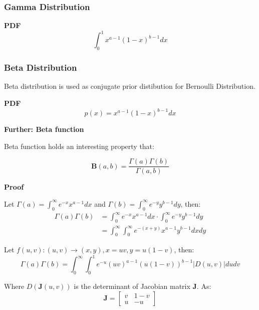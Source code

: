 \documentclass{article}
\begin{document}
\subsubsection{Gamma Distribution}
\vspace{2mm}
\textbf{PDF}
\begin{equation}
\int_0^1x^{a-1}(1-x)^{b-1}dx
\end{equation}

\subsubsection{Beta Distribution}
Beta distribution is used as conjugate prior distibution for Bernoulli Distribution.

\vspace{2mm}
\textbf{PDF}
\begin{equation}
p(x)=x^{a-1}(1-x)^{b-1}dx
\end{equation}

\vspace{2mm}
\textbf{Further: Beta function}

Beta function holds an interesting property that:

\begin{equation}
\mathbf{B}(a, b) = \frac{\Gamma{(a)}\Gamma{(b)}}{\Gamma{(a, b)}}
\end{equation}

\vspace{2mm}
\textbf{Proof}

Let \(\Gamma(a)=\int_0^{\infty}e^{-x}x^{a-1}dx\) and \(\Gamma(b)=\int_0^{\infty}e^{-y}y^{b-1}dy\), then:
\begin{equation}
\begin{split}
\Gamma(a)\Gamma(b)&=\int_0^{\infty}e^{-x}x^{a-1}dx \cdot \int_0^{\infty}e^{-y}y^{b-1}dy\\
&=\int_0^{\infty}\int_0^{\infty}e^{-(x+y)}x^{a-1}y^{b-1}dxdy
\end{split}
\end{equation}

Let \(f(u, v): (u, v) \rightarrow (x, y), x=uv, y=u(1-v)\), then:
\begin{equation}
\Gamma{(a)}\Gamma{(b)}=\int_0^{\infty}\int_0^1e^{-u}(uv)^{a-1}(u(1-v))^{b-1}
|D(u, v)|dudv
\end{equation}

Where \(D(\mathbf{J}(u, v))\) is the determinant of Jacobian matrix \(\mathbf{J}\). As:
\begin{equation}
\mathbf{J}=
\begin{bmatrix}
v & 1 - v \\
u & -u
\end{bmatrix}
\end{equation}
\end{document}
